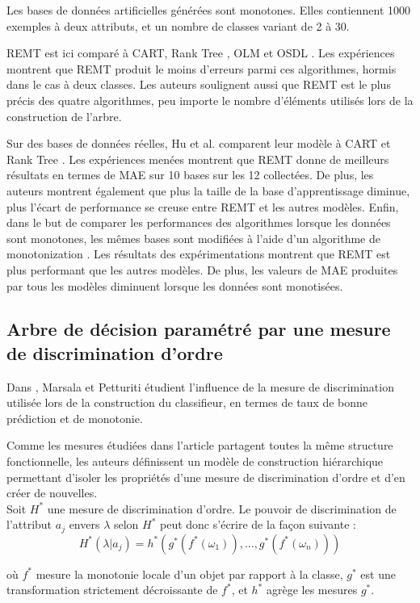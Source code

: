\documentclass[a4paper]{article}
\begin{document}
\noindent Les bases de données artificielles générées sont monotones. Elles contiennent
1000 exemples à deux attributs, et un nombre de classes variant de 2 à 30. 

\noindent REMT est ici comparé à CART, Rank Tree \cite{xia-ranking}, OLM
\cite{ben-learning} et OSDL \cite{cao-supervised}. Les expériences montrent que
REMT produit le moins d'erreurs parmi ces algorithmes, hormis dans le cas à deux
classes.  Les auteurs soulignent aussi que REMT est le plus précis des quatre
algorithmes, peu importe le nombre d'éléments utilisés lors de la construction
de l'arbre.


Sur des bases de données réelles, Hu et al. comparent leur modèle à CART et Rank
Tree \cite{xia-ranking}. Les expériences menées montrent que REMT donne de
meilleurs résultats en termes de MAE sur 10 bases sur les 12 collectées. De
plus, les auteurs montrent également que plus la taille de la base
d'apprentissage diminue, plus l'écart de performance se creuse entre REMT et les
autres modèles. 
\noindent Enfin, dans le but de comparer les performances des algorithmes
lorsque les données sont monotones, les mêmes bases sont modifiées à l'aide d'un
algorithme de monotonization . Les résultats des expérimentations montrent que
REMT est plus performant que les autres modèles. De plus, les valeurs de
MAE produites par tous les modèles diminuent lorsque les données sont
monotisées.

\subsection{Arbre de décision paramétré par une mesure de discrimination
d'ordre} 
Dans \cite{marsala-rank}, Marsala et Petturiti étudient l'influence de
la mesure de discrimination utilisée lors de la construction du classifieur, en
termes de taux de bonne prédiction et de monotonie. 

Comme les mesures étudiées dans l'article partagent toutes la même structure
fonctionnelle, les auteurs définissent un modèle de construction hiérarchique
permettant d'isoler les propriétés d'une mesure de discrimination d'ordre et
d'en créer de nouvelles. \\
Soit $H^*$ une mesure de discrimination d'ordre. Le pouvoir de discrimination de
l'attribut $a_j$ envers $\lambda$ selon $H^*$ peut donc s'écrire de la façon suivante :
$$ H^*(\lambda | a_j) = h^*(g^*(f^*(\omega_1)),...,g^*(f^*(\omega_n)))$$

où $f^*$ mesure la monotonie locale d'un objet par rapport à la classe, $g^*$
est une transformation strictement décroissante de $f^*$, et $h^*$ agrège les
mesures $g^*$. \\
\end{document}
